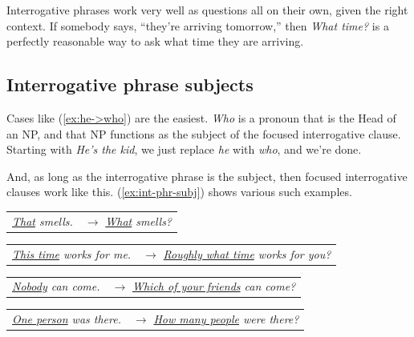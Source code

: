 Interrogative phrases work very well as questions all on their own, given the right context. If somebody says, ``they're arriving tomorrow,'' then \textit{What time?} is a perfectly reasonable way to ask what time they are arriving.

\subsection{Interrogative phrase subjects}\label{sec:focussed-subj}

Cases like (\ref{ex:he->who}) are the easiest. \textit{Who} is a pronoun that is the \textsf{Head} of an NP, and that NP functions as the subject of the focused interrogative clause. Starting with \textit{He's the kid}, we just replace \textit{he} with \textit{who}, and we're done.

    \label{ex:he->who}
    \z
And, as long as the interrogative phrase is the subject, then focused interrogative clauses work like this. (\ref{ex:int-phr-subj}) shows various such examples.

\begin{exe}
    \ex
    \begin{xlist}
        \ex 
        \begin{tabular}[t]{@{}p{4.1cm}@{}p{6cm}@{}}
            \textit{\uline{That} smells.} & \(\rightarrow\) \textit{\uline{What} smells?}
        \end{tabular}
        
        \ex 
        \begin{tabular}[t]{@{}p{4.1cm}@{}p{6cm}@{}}
            \textit{\uline{This time} works for me.} & \(\rightarrow\) \textit{\uline{Roughly what time} works for you?}
        \end{tabular}
        
        \ex 
        \begin{tabular}[t]{@{}p{4.1cm}@{}p{6cm}@{}}
            \textit{\uline{Nobody} can come.} & \(\rightarrow\) \textit{\uline{Which of your friends} can come?}
        \end{tabular}
        
        \ex \label{ex:person-people}
        \begin{tabular}[t]{@{}p{4.1cm}@{}p{6cm}@{}}
            \textit{\uline{One person} was there.} & \(\rightarrow\) \textit{\uline{How many people} were there?}
        \end{tabular}
    \end{xlist}
    \label{ex:int-phr-subj}
\end{exe}

